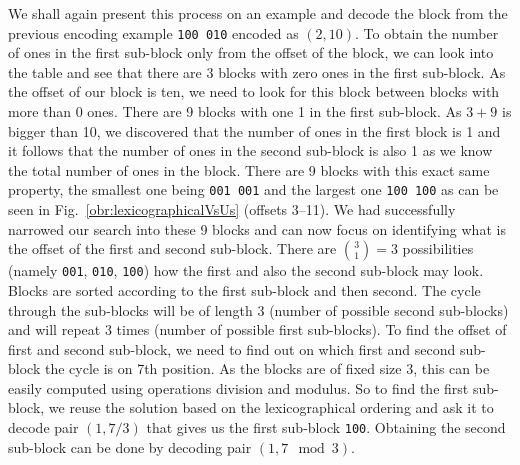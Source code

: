 We shall again present this process on an example and decode the block from the previous
encoding example {\tt 100 010} encoded as $(2, 10)$. To obtain the number of ones in
the first sub-block only from the offset of the block, we can look into the table and
see that there are 3 blocks with zero ones in the first sub-block. As the offset of our
block is ten, we need to look for this block between blocks with more than 0 ones. There
are 9 blocks with one 1 in the first sub-block. As $3+9$ is bigger than 10, we discovered
that the number of ones in the first block is 1 and it follows that the number of ones in
the second sub-block is also 1 as we know the total number of ones in the block. There are
9 blocks with this exact same property, the smallest one being {\tt 001 001} and the largest one
{\tt 100 100} as can be seen in Fig.~\ref{obr:lexicographicalVsUs} (offsets 3--11).
We had successfully narrowed our search into these 9 blocks and can now
focus on identifying what is the offset of the first and second sub-block. There are
${3 \choose 1} = 3$ possibilities (namely {\tt 001}, {\tt 010}, {\tt 100}) how the first
and also the second sub-block may look. Blocks are sorted according to the first sub-block
and then second. The cycle through the sub-blocks will be of length 3 (number of possible
second sub-blocks) and will repeat 3 times (number of possible first sub-blocks). To find the
offset of first and second sub-block, we need to find out on which first and second sub-block
the cycle is on 7th position. As the blocks are of fixed size 3, this can be easily computed
using operations division and modulus. So to find the first sub-block, we reuse the solution
based on the lexicographical ordering and ask it to decode pair $(1, 7/3)$ that gives us
the first sub-block {\tt 100}. Obtaining the second sub-block can be done by decoding pair
$(1, 7\mod 3)$.

